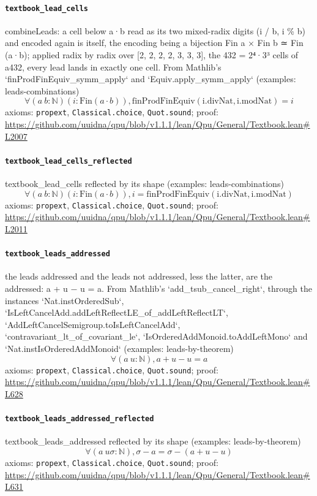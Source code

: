 \documentclass[11pt]{article}
\begin{document}
\paragraph{\texttt{textbook\_lead\_cells}}
combineLeads: a cell below a·b read as its two mixed-radix digits (i / b, i \% b) and encoded again is itself, the encoding being a bijection Fin a × Fin b ≃ Fin (a·b); applied radix by radix over [2, 2, 2, 2, 3, 3, 3], the 432 = 2⁴·3³ cells of a432, every lead lands in exactly one cell. From Mathlib's `finProdFinEquiv\_symm\_apply` and `Equiv.apply\_symm\_apply` (examples: leads-combinations)
\[ \forall (a\ b : \mathbb{N}) (i : \mathrm{Fin} (a \cdot b)), \mathrm{finProdFinEquiv} (\mathrm{i.divNat}, \mathrm{i.modNat}) = i \]
\noindent axioms: \texttt{propext}, \texttt{Classical.choice}, \texttt{Quot.sound}; proof: \url{https://github.com/uuidna/qpu/blob/v1.1.1/lean/Qpu/General/Textbook.lean\#L2007}

\paragraph{\texttt{textbook\_lead\_cells\_reflected}}
textbook\_lead\_cells reflected by its shape (examples: leads-combinations)
\[ \forall (a\ b : \mathbb{N}) (i : \mathrm{Fin} (a \cdot b)), i = \mathrm{finProdFinEquiv} (\mathrm{i.divNat}, \mathrm{i.modNat}) \]
\noindent axioms: \texttt{propext}, \texttt{Classical.choice}, \texttt{Quot.sound}; proof: \url{https://github.com/uuidna/qpu/blob/v1.1.1/lean/Qpu/General/Textbook.lean\#L2011}

\paragraph{\texttt{textbook\_leads\_addressed}}
the leads addressed and the leads not addressed, less the latter, are the addressed: a + u − u = a. From Mathlib's `add\_tsub\_cancel\_right`, through the instances `Nat.instOrderedSub`, `IsLeftCancelAdd.addLeftReflectLE\_of\_addLeftReflectLT`, `AddLeftCancelSemigroup.toIsLeftCancelAdd`, `contravariant\_lt\_of\_covariant\_le`, `IsOrderedAddMonoid.toAddLeftMono` and `Nat.instIsOrderedAddMonoid` (examples: leads-by-theorem)
\[ \forall (a\ u : \mathbb{N}), a + u - u = a \]
\noindent axioms: \texttt{propext}, \texttt{Classical.choice}, \texttt{Quot.sound}; proof: \url{https://github.com/uuidna/qpu/blob/v1.1.1/lean/Qpu/General/Textbook.lean\#L628}

\paragraph{\texttt{textbook\_leads\_addressed\_reflected}}
textbook\_leads\_addressed reflected by its shape (examples: leads-by-theorem)
\[ \forall (a\ u \sigma : \mathbb{N}), \sigma - a = \sigma - (a + u - u) \]
\noindent axioms: \texttt{propext}, \texttt{Classical.choice}, \texttt{Quot.sound}; proof: \url{https://github.com/uuidna/qpu/blob/v1.1.1/lean/Qpu/General/Textbook.lean\#L631}
\end{document}
